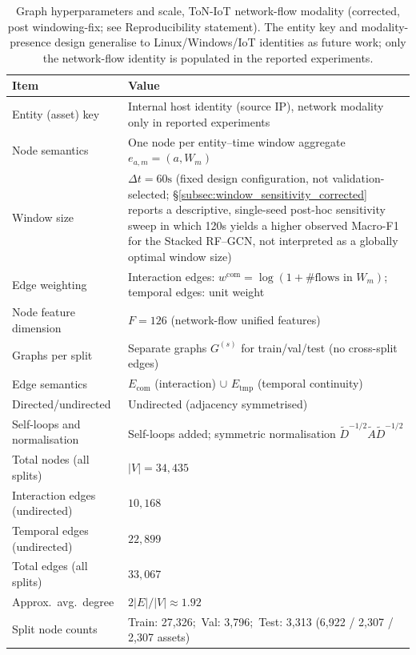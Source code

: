 \documentclass[pdflatex,sn-mathphys-num]{sn-jnl}
\theoremstyle{thmstyleone}%
\theoremstyle{thmstyletwo}%
\theoremstyle{thmstylethree}%
\begin{document}
\begin{table}[!t]
\centering
\caption{Graph hyperparameters and scale, ToN-IoT network-flow modality (corrected, post windowing-fix; see Reproducibility statement). The entity key and modality-presence design generalise to Linux/Windows/IoT identities as future work; only the network-flow identity is populated in the reported experiments.}
\label{tab:graph_hparams_stats}
\renewcommand{\arraystretch}{1.12}
\begin{tabular}{p{5cm} p{8cm}}
\toprule
\textbf{Item} & \textbf{Value} \\
\midrule
Entity (asset) key & Internal host identity (source IP), network modality only in reported experiments \\
Node semantics & One node per entity--time window aggregate $e_{a,m}=(a,W_m)$ \\
Window size & $\Delta t = 60\text{s}$ (fixed design configuration, not validation-selected; \S\ref{subsec:window_sensitivity_corrected} reports a descriptive, single-seed post-hoc sensitivity sweep in which 120s yields a higher observed Macro-F1 for the Stacked RF--GCN, not interpreted as a globally optimal window size) \\
Edge weighting & Interaction edges: $w^{\mathrm{com}}=\log(1+\#\text{flows in }W_m)$; temporal edges: unit weight \\
Node feature dimension & $F=126$ (network-flow unified features) \\
Graphs per split & Separate graphs $G^{(s)}$ for train/val/test (no cross-split edges) \\
Edge semantics & $E_{\mathrm{com}}$ (interaction) $\cup$ $E_{\mathrm{tmp}}$ (temporal continuity) \\
Directed/undirected & Undirected (adjacency symmetrised) \\
Self-loops and normalisation & Self-loops added; symmetric normalisation $\tilde{D}^{-1/2}\tilde{A}\tilde{D}^{-1/2}$ \\
\midrule
Total nodes (all splits) & $|V|=34{,}435$ \\
Interaction edges (undirected) & $10{,}168$ \\
Temporal edges (undirected) & $22{,}899$ \\
Total edges (all splits) & $33{,}067$ \\
Approx.\ avg.\ degree & $2|E|/|V|\approx 1.92$ \\
Split node counts & Train: 27{,}326;\ Val: 3{,}796;\ Test: 3{,}313 (6{,}922 / 2{,}307 / 2{,}307 assets) \\
\bottomrule
\end{tabular}
\end{table}
\end{document}
